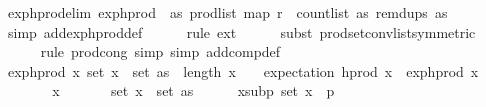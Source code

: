 \begin{isabellebody}
\ exp{\isacharunderscore}{\kern0pt}h{\isacharunderscore}{\kern0pt}prod{\isacharunderscore}{\kern0pt}elim{\isacharcolon}{\kern0pt}\ {\isachardoublequoteopen}exp{\isacharunderscore}{\kern0pt}h{\isacharunderscore}{\kern0pt}prod\ {\isacharequal}{\kern0pt}\ {\isacharparenleft}{\kern0pt}{\isasymlambda}as{\isachardot}{\kern0pt}\ prod{\isacharunderscore}{\kern0pt}list\ {\isacharparenleft}{\kern0pt}map\ {\isacharparenleft}{\kern0pt}r\ {\isasymcirc}\ count{\isacharunderscore}{\kern0pt}list\ as{\isacharparenright}{\kern0pt}\ {\isacharparenleft}{\kern0pt}remdups\ as{\isacharparenright}{\kern0pt}{\isacharparenright}{\kern0pt}{\isacharparenright}{\kern0pt}{\isachardoublequoteclose}\ \isanewline
\ \ \ \ \isamarkupfalse%
\ {\isacharparenleft}{\kern0pt}simp\ add{\isacharcolon}{\kern0pt}exp{\isacharunderscore}{\kern0pt}h{\isacharunderscore}{\kern0pt}prod{\isacharunderscore}{\kern0pt}def{\isacharparenright}{\kern0pt}\isanewline
\ \ \ \ \isamarkupfalse%
\ {\isacharparenleft}{\kern0pt}rule\ ext{\isacharparenright}{\kern0pt}\isanewline
\ \ \ \ \isamarkupfalse%
\ {\isacharparenleft}{\kern0pt}subst\ prod{\isachardot}{\kern0pt}set{\isacharunderscore}{\kern0pt}conv{\isacharunderscore}{\kern0pt}list{\isacharbrackleft}{\kern0pt}symmetric{\isacharbrackright}{\kern0pt}{\isacharparenright}{\kern0pt}\isanewline
\ \ \ \ \isamarkupfalse%
\ {\isacharparenleft}{\kern0pt}rule\ prod{\isachardot}{\kern0pt}cong{\isacharcomma}{\kern0pt}\ simp{\isacharcomma}{\kern0pt}\ simp\ add{\isacharcolon}{\kern0pt}comp{\isacharunderscore}{\kern0pt}def{\isacharparenright}{\kern0pt}\isanewline
\isanewline
\ \ \isamarkupfalse%
\ exp{\isacharunderscore}{\kern0pt}h{\isacharunderscore}{\kern0pt}prod{\isacharcolon}{\kern0pt}\ {\isachardoublequoteopen}{\isasymAnd}x{\isachardot}{\kern0pt}\ set\ x\ {\isasymsubseteq}\ set\ as\ {\isasymLongrightarrow}\ length\ x\ {\isasymle}\ {}\ {\isasymLongrightarrow}\ expectation\ {\isacharparenleft}{\kern0pt}h{\isacharunderscore}{\kern0pt}prod\ x{\isacharparenright}{\kern0pt}\ {\isacharequal}{\kern0pt}\ exp{\isacharunderscore}{\kern0pt}h{\isacharunderscore}{\kern0pt}prod\ x{\isachardoublequoteclose}\isanewline
\ \ \isamarkupfalse%
\ {\isacharminus}{\kern0pt}\isanewline
\ \ \ \ \isamarkupfalse%
\ x\ \isanewline
\ \ \ \ \isamarkupfalse%
\ {\isachardoublequoteopen}set\ x\ {\isasymsubseteq}\ set\ as{\isachardoublequoteclose}\isanewline
\ \ \ \ \isamarkupfalse%
\ x{\isacharunderscore}{\kern0pt}sub{\isacharunderscore}{\kern0pt}p{\isacharcolon}{\kern0pt}\ {\isachardoublequoteopen}set\ x\ {\isasymsubseteq}\ {\isacharbraceleft}{\kern0pt}{}{\isachardot}{\kern0pt}{\isachardot}{\kern0pt}{\isacharless}{\kern0pt}p{\isacharbraceright}{\kern0pt}{\isachardoublequoteclose}\ \isamarkupfalse%

\end{isabellebody}
